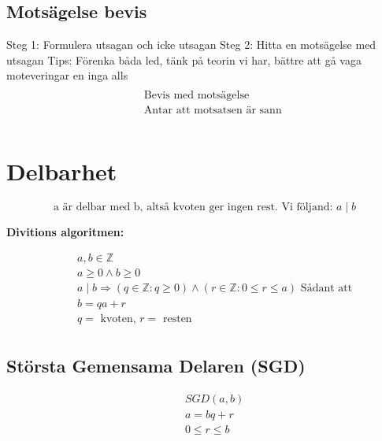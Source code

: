 \documentclass{article}
\begin{document}
\subsection{Motsägelse bevis}
Steg 1: Formulera utsagan och icke utsagan
Steg 2: Hitta en motsägelse med utsagan
Tips: Förenka båda led, tänk på teorin vi har, bättre att gå vaga moteveringar en inga alls
\begin{align*}
  &\quad  \\
  &\quad  \text{Bevis med motsägelse } \\
  &\quad  \text{Antar att motsatsen är sann  } \\
  &\quad  \\
\end{align*}


\newpage

\section{Delbarhet}
\begin{equation}
  \text{a är delbar med b, altså kvoten ger ingen rest. Vi följand: } a \mid b
\end{equation}


\textbf{Divitions algoritmen:}\par
\begin{align*}
  &\quad a, b \in \mathbb{Z}  \\
  &\quad a  \geq 0 \land b  \geq  0 \\
  &\quad a \mid b \Rightarrow (q \in \mathbb{Z} : q \geq 0) \land (r \in \mathbb{Z} : 0 \leq r \leq a) \text{ Sådant att} \\
  &\quad b = q a + r\\
  &\quad q = \text{ kvoten, } r = \text{ resten} \\
\end{align*}



\subsection{Största Gemensama Delaren (SGD)}
\begin{align*}
  &\quad SGD(a,b) \\
  &\quad a = bq + r \\
  &\quad 0 \leq r \leq b \\
\end{align*}
\end{document}
